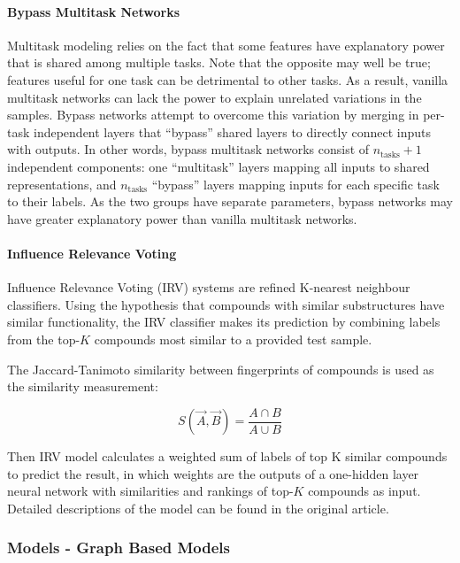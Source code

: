\paragraph{Bypass Multitask Networks}

Multitask modeling relies on the fact that some features have explanatory power that is shared among multiple tasks. Note that the opposite may well be true; features useful for one task can be detrimental to other tasks. As a result, vanilla multitask networks can lack the power to explain unrelated variations in the samples. Bypass networks attempt to overcome this variation by merging in per-task independent layers that ``bypass'' shared layers to directly connect inputs with outputs.\cite{Bypass_network} In other words, bypass multitask networks consist of $n_\text{tasks}+1$ independent components: one ``multitask'' layers mapping all inputs to shared representations, and $n_\text{tasks}$ ``bypass'' layers mapping inputs for each specific task to their labels. As the two groups have separate parameters, bypass networks may have greater explanatory power than vanilla multitask networks.

\paragraph{Influence Relevance Voting}

Influence Relevance Voting (IRV) systems are refined K-nearest neighbour classifiers.\cite{IRV} Using the hypothesis that compounds with similar substructures have similar functionality, the IRV classifier makes its prediction by combining labels from the top-$K$ compounds most similar to a provided test sample.

The Jaccard-Tanimoto similarity between fingerprints of compounds is used as the similarity measurement:

\begin{equation*}
    S(\vec{A},\vec{B})=
    \frac{A\cap B}{A\cup B}
\end{equation*}

Then IRV model calculates a weighted sum of labels of top K similar compounds to predict the result, in which weights are the outputs of a one-hidden layer neural network with similarities and rankings of top-$K$ compounds as input. Detailed descriptions of the model can be found in the original article.\cite{IRV} 

\subsubsection{Models - Graph Based Models}

